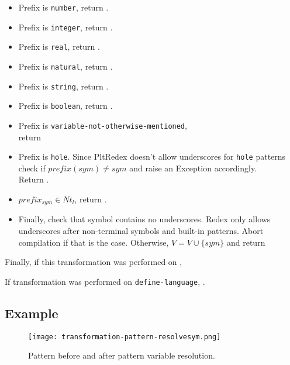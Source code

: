 \begin{itemize}
\item Prefix is \texttt{number}, return \BuiltInPattern[Number][$sym$][false].
\item Prefix is \texttt{integer}, return \BuiltInPattern[Integer][$sym$][false].
\item Prefix is \texttt{real}, return \BuiltInPattern[Real][$sym$][false].
\item Prefix is \texttt{natural}, return \BuiltInPattern[Natural][$sym$][false].
\item Prefix is \texttt{string}, return \BuiltInPattern[String][$sym$][false].
\item Prefix is \texttt{boolean}, return \BuiltInPattern[Boolean][$sym$][false].
\item Prefix is \texttt{variable-not-otherwise-mentioned}, \\ return \BuiltInPattern[Variable][$sym$][false]
\item Prefix is \texttt{hole}. Since PltRedex doesn't allow underscores for \texttt{hole} patterns check if $prefix(sym) \neq sym$ and raise an Exception accordingly. \\ Return \BuiltInPattern[Hole][$sym$][false].
\item $prefix_{sym} \in Nt_l$, return .
\item Finally, check that symbol contains no underscores. Redex only allows underscores after non-terminal symbols and built-in patterns. Abort compilation if that is the case. Otherwise, $V=V\cup\{sym\}$ and return \LiteralPattern[Variable][$sym$][false]
\end{itemize}

Finally, if this transformation was performed on , 

If transformation was performed on \texttt{define-language}, .

\subsection{Example}

\begin{figure}[H]
\texttt{[image: transformation-pattern-resolvesym.png]}
\caption{Pattern before and after pattern variable resolution.}
\label{transformation-pattern-resolvesym}
\end{figure}

